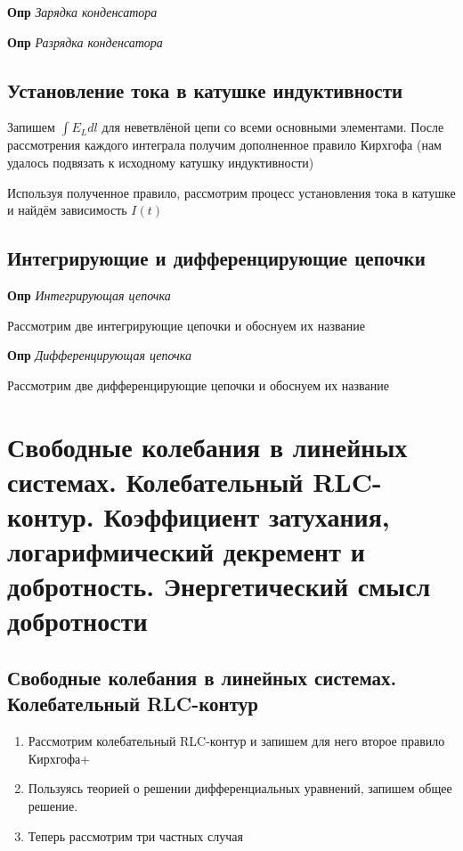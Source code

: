 \documentclass[a4paper, 14pt]{article}
\begin{document}
    \textbf{Опр} \textit{Зарядка конденсатора}
    
    \textbf{Опр} \textit{Разрядка конденсатора}
    
    \subsection{Установление тока в катушке индуктивности}
    
    Запишем $\int E_L dl$ для неветвлёной цепи со всеми основными элементами.
    После рассмотрения каждого интеграла получим дополненное правило Кирхгофа (нам удалось подвязать к исходному
    катушку индуктивности)
    
    Используя полученное правило, рассмотрим процесс установления тока в катушке и найдём зависимость $I(t)$
    
    \subsection{Интегрирующие и дифференцирующие цепочки}
    
    \textbf{Опр} \textit{Интегрирующая цепочка}
    
    Рассмотрим две интегрирующие цепочки и обоснуем их название
    
    \textbf{Опр} \textit{Дифференцирующая цепочка}
    
    Рассмотрим две дифференцирующие цепочки и обоснуем их название
    
    \section{Свободные колебания в линейных системах. Колебательный RLC-контур.
    Коэффициент затухания, логарифмический декремент и добротность.
    Энергетический смысл добротности}
    
    \subsection{Свободные колебания в линейных системах. Колебательный RLC-контур}
    
    \begin{enumerate}
        \item Рассмотрим колебательный RLC-контур и запишем для него второе правило Кирхгофа+
        \item Пользуясь теорией о решении дифференциальных уравнений, запишем общее решение.
        \item Теперь рассмотрим три частных случая
    \end{enumerate}
    
\end{document}

